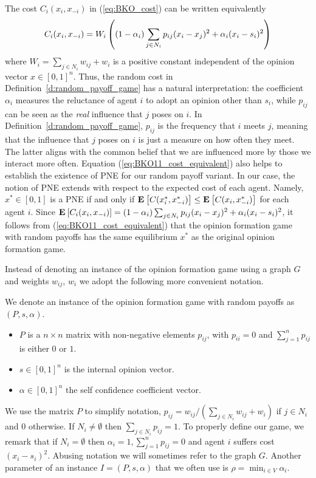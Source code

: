 The cost $C_i(x_i,x_{-i})$ in (\ref{eq:BKO_cost}) can be written equivalently
\begin{equation}\label{eq:BKO11_cost_equivalent}
  C_i(x_i,x_{-i}) =
  W_i\left( (1-\alpha_i)\sum_{j \in N_i} p_{ij}(x_i-x_j)^2
  + \alpha_i(x_i-s_i)^2\right)
\end{equation}
where $W_i=\sum_{j\in N_i}w_{ij} + w_i$ is a positive constant independent
of the opinion vector $x\in [0,1]^n$.
Thus, the random cost in Definition~\ref{d:random_payoff_game} has a natural
interpretation: the coefficient $\alpha_i$
measures the reluctance of agent $i$ to adopt an opinion other than $s_i$, while
$p_{ij}$ can be seen as the \emph{real} influence that $j$ poses on $i$.
In Definition~\ref{d:random_payoff_game}, $p_{ij}$ is the frequency that
$i$ meets $j$, meaning that the influence that $j$ poses on $i$ is just a measure
on how often they meet. The latter aligns with the common belief
that we are influenced more by those we interact more often.
Equation (\ref{eq:BKO11_cost_equivalent}) also helps to establish the existence of PNE for
our random payoff variant. In our case, the notion of PNE extends
with respect to the expected cost of each agent. Namely,
$x^* \in [0,1]$ is a PNE if and only if
$\Exp{C(x_i^*, x_{-i}^*)} \leq \Exp{C(x_i, x_{-i}^*)}$
for each agent $i$.
Since
$\bm{\mathrm{E}}_{} \left[ C_i(x_i,x_{-i}) \right]=
(1-\alpha_i) \sum_{j \in N_i}p_{ij}(x_i-x_j)^2 + \alpha_i(x_i-s_i)^2 $,
it follows from (\ref{eq:BKO11_cost_equivalent}) that the
opinion formation game with random payoffs has the same equilibrium $x^*$ as
the original opinion formation game.

Instead of denoting an instance of the opinion formation game using a graph $G$
and weights $w_{ij}$, $w_i$ we adopt the following more convenient notation.
%
\begin{definition}\label{d:random_payof_game_instance}
  We denote an instance of the opinion formation game with random payoffs as $(P,s,\alpha)$.
  \begin{itemize}
    \item $P$ is a $n \times n$  matrix with non-negative elements $p_{ij}$,
      with $p_{ii}=0$ and $\sum_{j=1}^n p_{ij}$ is either $0$ or $1$.
    \item $s \in [0,1]^n$ is the internal opinion vector.
    \item $\alpha \in [0,1]^n$ the self confidence coefficient vector.
  \end{itemize}
\end{definition}
%
We use the matrix $P$ to simplify notation, $p_{ij} = w_{ij}/(\sum_{j \in N_i}w_{ij}+w_i)$ 
if $j \in N_i$ and $0$ otherwise. If $N_i \neq \emptyset$ then $\sum_{j \in N_i}p_{ij}=1$. 
To properly define our game, we remark that if $N_i=\emptyset$ then
$\alpha_i=1,\sum_{j=1}^np_{ij}=0$ and agent $i$ suffers cost $(x_i-s_i)^2$. 
Abusing notation we will sometimes refer to the graph $G$. 
Another parameter of an instance $I=(P,s,\alpha)$ that 
we often use is $\rho=\min_{i \in V}\alpha_i$.


